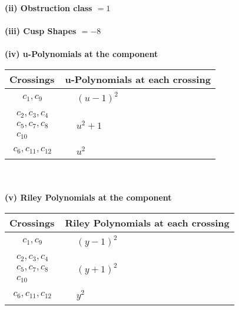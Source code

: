 \documentclass[1p]{elsarticle_modified}
\theoremstyle{definition}
\begin{document}
\flushleft \textbf{(ii) Obstruction class $= 1$}\\~\\
\flushleft \textbf{(iii) Cusp Shapes $= -8$}\\~\\
\newpage\renewcommand{\arraystretch}{1}
\flushleft \textbf{(iv) u-Polynomials at the component}\newline \\
\begin{tabular}{m{50pt}|m{274pt}}
Crossings & \hspace{64pt}u-Polynomials at each crossing \\
\hline $$\begin{aligned}c_{1},c_{9}\end{aligned}$$&$\begin{aligned}
&(u-1)^2
\end{aligned}$\\
\hline $$\begin{aligned}c_{2},c_{3},c_{4}\\c_{5},c_{7},c_{8}\\c_{10}\end{aligned}$$&$\begin{aligned}
&u^2+1
\end{aligned}$\\
\hline $$\begin{aligned}c_{6},c_{11},c_{12}\end{aligned}$$&$\begin{aligned}
&u^2
\end{aligned}$\\
\hline
\end{tabular}\\~\\
\newpage\renewcommand{\arraystretch}{1}
\flushleft \textbf{(v) Riley Polynomials at the component}\newline \\
\begin{tabular}{m{50pt}|m{274pt}}
Crossings & \hspace{64pt}Riley Polynomials at each crossing \\
\hline $$\begin{aligned}c_{1},c_{9}\end{aligned}$$&$\begin{aligned}
&(y-1)^2
\end{aligned}$\\
\hline $$\begin{aligned}c_{2},c_{3},c_{4}\\c_{5},c_{7},c_{8}\\c_{10}\end{aligned}$$&$\begin{aligned}
&(y+1)^2
\end{aligned}$\\
\hline $$\begin{aligned}c_{6},c_{11},c_{12}\end{aligned}$$&$\begin{aligned}
&y^2
\end{aligned}$\\
\hline
\end{tabular}\\~\\
\end{document}
